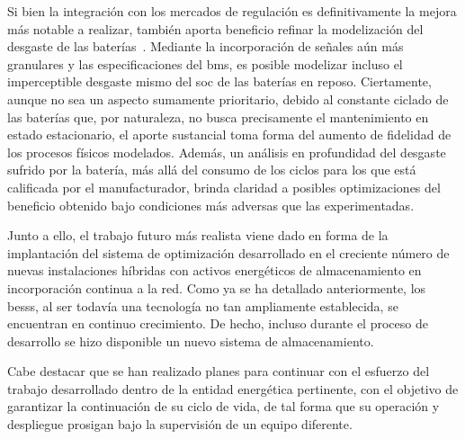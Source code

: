 Si bien la integración con los mercados de regulación es definitivamente la mejora más notable a realizar, también aporta beneficio refinar la modelización del desgaste de las baterías~\cite{shamarova2022review}. Mediante la incorporación de señales aún más granulares y las especificaciones del \gls{bms}, es posible modelizar incluso el imperceptible desgaste mismo del \gls{soc} de las baterías en reposo. Ciertamente, aunque no sea un aspecto sumamente prioritario, debido al constante ciclado de las baterías que, por naturaleza, no busca precisamente el mantenimiento en estado estacionario, el aporte sustancial toma forma del aumento de fidelidad de los procesos físicos modelados. Además, un análisis en profundidad del desgaste sufrido por la batería, más allá del consumo de los ciclos para los que está calificada por el manufacturador, brinda claridad a posibles optimizaciones del beneficio obtenido bajo condiciones más adversas que las experimentadas.

Junto a ello, el trabajo futuro más realista viene dado en forma de la implantación del sistema de optimización desarrollado en el creciente número de nuevas instalaciones híbridas con activos energéticos de almacenamiento en incorporación continua a la red. Como ya se ha detallado anteriormente, los \glspl{bess}, al ser todavía una tecnología no tan ampliamente establecida, se encuentran en continuo crecimiento. De hecho, incluso durante el proceso de desarrollo se hizo disponible un nuevo sistema de almacenamiento.

Cabe destacar que se han realizado planes para continuar con el esfuerzo del trabajo desarrollado dentro de la entidad energética pertinente, con el objetivo de garantizar la continuación de su ciclo de vida, de tal forma que su operación y despliegue prosigan bajo la supervisión de un equipo diferente.
